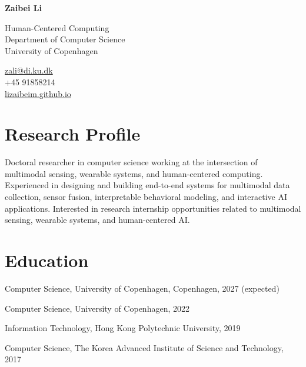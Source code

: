 \documentclass[11pt,letterpaper]{report}
\newcommand{\myname}{Zaibei Li}
\newcommand{\namefont}[1]{{\normalfont\bfseries\Huge{#1}}}
\begin{document}
    \raggedright{}

    \namefont{\myname}

    \vspace{1em}
    \begin{minipage}[t]{0.700\textwidth}
        Human-Centered Computing\\
        Department of Computer Science\\
        University of Copenhagen
    \end{minipage}
    \begin{minipage}[t]{0.295\textwidth}
        \flushright{}
        \href{mailto:zali@di.ku.dk}{zali@di.ku.dk} \\
        +45 91858214 \\
        \href{https://lizaibeim.github.io}{lizaibeim.github.io}
    \end{minipage}
    
    \section*{Research Profile}

    Doctoral researcher in computer science working at the intersection of multimodal sensing, wearable systems, and human-centered computing. Experienced in designing and building end-to-end systems for multimodal data collection, sensor fusion, interpretable behavioral modeling, and interactive AI applications. Interested in research internship opportunities related to multimodal sensing, wearable systems, and human-centered AI.
    
    \section*{Education}

    \begin{tablist}

        \item[Ph.D.] \tab{}Computer Science, University of Copenhagen, Copenhagen, 2027 (expected)
        \item[M.S.]  \tab{}Computer Science, University of Copenhagen, 2022
        \item[B.S.]  \tab{}Information Technology, Hong Kong Polytechnic University, 2019
        \item[Exchange]  \tab{}Computer Science, The Korea Advanced Institute of Science and Technology, 2017

    \end{tablist}
\end{document}
